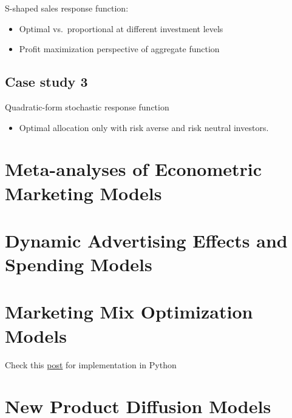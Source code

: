 \documentclass[
]{book}
\providecommand{\tightlist}{%
  \setlength{\itemsep}{0pt}\setlength{\parskip}{0pt}}
\begin{document}
S-shaped sales response function:

\begin{itemize}
\tightlist
\item
  Optimal vs.~proportional at different investment levels
\item
  Profit maximization perspective of aggregate function
\end{itemize}

\hypertarget{case-study-3}{%
\subsection{Case study 3}\label{case-study-3}}

Quadratic-form stochastic response function

\begin{itemize}
\tightlist
\item
  Optimal allocation only with risk averse and risk neutral investors.
\end{itemize}

\hypertarget{meta-analyses-of-econometric-marketing-models}{%
\section{Meta-analyses of Econometric Marketing Models}\label{meta-analyses-of-econometric-marketing-models}}

\hypertarget{dynamic-advertising-effects-and-spending-models}{%
\section{Dynamic Advertising Effects and Spending Models}\label{dynamic-advertising-effects-and-spending-models}}

\hypertarget{marketing-mix-optimization-models}{%
\section{Marketing Mix Optimization Models}\label{marketing-mix-optimization-models}}

Check this \href{https://towardsdatascience.com/carryover-and-shape-effects-in-media-mix-modeling-paper-review-fd699b509e2d}{post} for implementation in Python

\hypertarget{new-product-diffusion-models}{%
\section{New Product Diffusion Models}\label{new-product-diffusion-models}}
\end{document}
